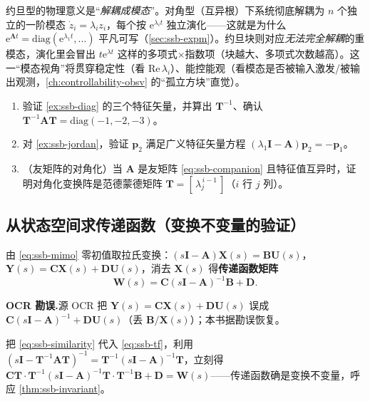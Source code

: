 \begin{insight}
约旦型的物理意义是“\emph{解耦成模态}”。对角型（互异根）下系统彻底解耦为 $n$ 个独立的一阶模态 $\dot z_i=\lambda_i z_i$，每个按 $\mathrm{e}^{\lambda_i t}$ 独立演化——这就是为什么 $\mathrm{e}^{\boldsymbol{\Lambda}t}=\mathrm{diag}(\mathrm{e}^{\lambda_1 t},\dots)$ 平凡可写（\cref{sec:ssb-expm}）。约旦块则对应\emph{无法完全解耦}的重模态，演化里会冒出 $t\mathrm{e}^{\lambda t}$ 这样的多项式$\times$指数项（块越大、多项式次数越高）。这一“模态视角”将贯穿稳定性（看 $\mathrm{Re}\,\lambda_i$）、能控能观（看模态是否被输入激发/被输出观测，\cref{ch:controllability-obsv} 的“孤立方块”直觉）。
\end{insight}

\begin{practice}
\begin{enumerate}
  \item 验证 \cref{ex:ssb-diag} 的三个特征矢量，并算出 $\mathbf{T}^{-1}$、确认 $\mathbf{T}^{-1}\mathbf{A}\mathbf{T}=\mathrm{diag}(-1,-2,-3)$。
  \item 对 \cref{ex:ssb-jordan}，验证 $\mathbf{p}_2$ 满足广义特征矢量方程 $(\lambda_1\mathbf{I}-\mathbf{A})\mathbf{p}_2=-\mathbf{p}_1$。
  \item （友矩阵的对角化）当 $\mathbf{A}$ 是友矩阵 \cref{eq:ssb-companion} 且特征值互异时，证明对角化变换阵是范德蒙德矩阵 $\mathbf{T}=[\,\lambda_j^{\,i-1}\,]$（$i$ 行 $j$ 列）。
\end{enumerate}
\end{practice}

\subsection{从状态空间求传递函数（变换不变量的验证）}
\label{sec:ssb-tf}

由 \cref{eq:ssb-mimo} 零初值取拉氏变换：$(s\mathbf{I}-\mathbf{A})\mathbf{X}(s)=\mathbf{B}\mathbf{U}(s)$，$\mathbf{Y}(s)=\mathbf{C}\mathbf{X}(s)+\mathbf{D}\mathbf{U}(s)$，消去 $\mathbf{X}(s)$ 得\textbf{传递函数矩阵}
\begin{equation}
  \mathbf{W}(s)=\mathbf{C}(s\mathbf{I}-\mathbf{A})^{-1}\mathbf{B}+\mathbf{D}.
  \label{eq:ssb-tf}
\end{equation}
\begin{note}\textbf{OCR 勘误.}\;源 OCR 把 $\mathbf{Y}(s)=\mathbf{C}\mathbf{X}(s)+\mathbf{D}\mathbf{U}(s)$ 误成 $\mathbf{C}(s\mathbf{I}-\mathbf{A})^{-1}+\mathbf{D}\mathbf{U}(s)$（丢 $\mathbf{B}/\mathbf{X}(s)$）；本书据勘误恢复\cite{liubao2006modern}。\end{note}
把 \cref{eq:ssb-similarity} 代入 \cref{eq:ssb-tf}，利用 $(s\mathbf{I}-\mathbf{T}^{-1}\mathbf{A}\mathbf{T})^{-1}=\mathbf{T}^{-1}(s\mathbf{I}-\mathbf{A})^{-1}\mathbf{T}$，立刻得 $\mathbf{C}\mathbf{T}\cdot\mathbf{T}^{-1}(s\mathbf{I}-\mathbf{A})^{-1}\mathbf{T}\cdot\mathbf{T}^{-1}\mathbf{B}+\mathbf{D}=\mathbf{W}(s)$——传递函数确是变换不变量，呼应 \cref{thm:ssb-invariant}。

